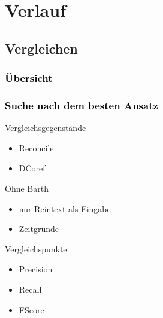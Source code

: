 \documentclass[xcolor=dvipsnames]{beamer}
\begin{document}

\section{Verlauf}


\subsection{Vergleichen}


\begin{frame}[plain]\frametitle{\textcolor{black}{Übersicht}}


\end{frame}

\addtocounter{framenumber}{-1}


\begin{frame}\frametitle{\textcolor{black}{Suche nach dem besten Ansatz}}

\begin{block}{Vergleichsgegenstände}
\begin{itemize}
\item Reconcile
\item DCoref
\end{itemize}
\end{block}

\begin{block}{Ohne Barth}
\begin{itemize}
\item nur Reintext als Eingabe
\item Zeitgründe
\end{itemize}
\end{block}

\begin{block}{Vergleichspunkte}
\begin{itemize}
\item Precision
\item Recall
\item FScore
\end{itemize}
\end{block}

\end{frame}
\end{document}
